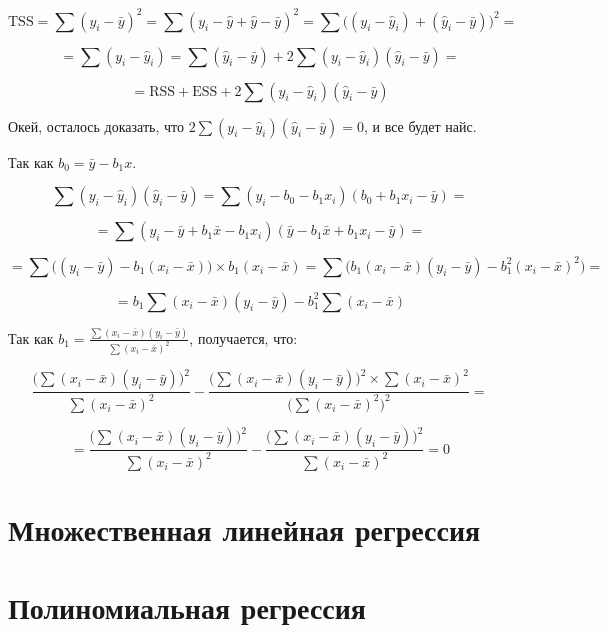 \documentclass[
  letterpaper,
  DIV=11,
  numbers=noendperiod]{scrreprt}
\theoremstyle{definition}
\theoremstyle{remark}
\begin{document}
\[
\mathrm{TSS} = 
\sum (y_i - \bar y)^2 = 
\sum (y_i - \hat y + \hat y - \bar y)^2 = 
\sum \big( (y_i - \hat y_i) + (\hat y_i - \bar y) \big)^2 = 
\]

\[
= \sum (y_i - \hat y_i) = \sum (\hat y_i - \bar y) + 2 \sum (y_i - \hat y_i)(\hat y_i - \bar y) = 
\]

\[
= \mathrm{RSS} + \mathrm{ESS} + 2 \sum (y_i - \hat y_i)(\hat y_i - \bar y)
\]

Окей, осталось доказать, что
\(2 \sum (y_i - \hat y_i)(\hat y_i - \bar y) = 0\), и все будет найс.

Так как \(b_0 = \bar y - b_1 x\).

\[
\sum (y_i - \hat y_i)(\hat y_i - \bar y) = \sum (y_i - b_0 - b_1 x_i) (b_0 + b_1 x_i - \bar y) =
\]

\[
= \sum (y_i - \bar y + b_1 \bar x - b_1x_i) (\bar y - b_1 \bar x + b_1 x_i - \bar y) =
\]

\[
= \sum \big( (y_i - \bar y) - b_1(x_i - \bar x) \big) \times b_1 (x_i - \bar x) = 
\sum \big( b_1 (x_i - \bar x) (y_i - \bar y) - b_1^2 (x_i - \bar x)^2 \big) = 
\]

\[
= b_1 \sum (x_i - \bar x) (y_i - \bar y) - b_1^2 \sum (x_i - \bar x)
\]

Так как
\(b_1 = \frac{\sum(x_i - \bar x)(y_i - \bar y)}{\sum (x_i - \bar x)^2}\),
получается, что:

\[
\frac{\Big( \sum (x_i - \bar x) (y_i - \bar y) \Big)^2}{\sum (x_i - \bar x)^2} - \frac{\Big( \sum (x_i - \bar x) (y_i - \bar y) \Big)^2 \times \sum (x_i - \bar x)^2}{\Big( \sum (x_i - \bar x)^2\Big)^2} = 
\]

\[
= \frac{\Big( \sum (x_i - \bar x) (y_i - \bar y) \Big)^2}{\sum (x_i - \bar x)^2} - \frac{\Big( \sum (x_i - \bar x) (y_i - \bar y) \Big)^2}{\sum (x_i - \bar x)^2} = 0
\]


\chapter{Множественная линейная регрессия}\label{andan-multiplelinear}


\chapter{Полиномиальная регрессия}\label{andan-polynomial}

\end{document}
